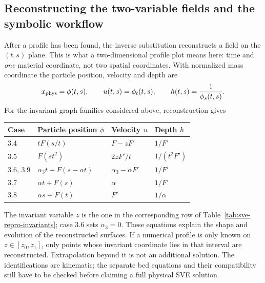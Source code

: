 \documentclass[11pt]{article}
\theoremstyle{definition}
\begin{document}
\subsection{Reconstructing the two-variable fields and the symbolic workflow}
After a profile has been found, the inverse substitution reconstructs a
field on the $(t,s)$ plane. This is what a two-dimensional profile plot
means here: time and \emph{one} material coordinate, not two spatial
coordinates. With normalized mass coordinate the particle position,
velocity and depth are
\[
 x_{\rm phys}=\phi(t,s),\qquad u(t,s)=\phi_t(t,s),\qquad
 h(t,s)=\frac1{\phi_s(t,s)}.
\]
For the invariant graph families considered above, reconstruction gives
\begin{center}\small
\begin{tabular}{@{}llll@{}}
\toprule
Case & Particle position $\phi$ & Velocity $u$ & Depth $h$\\
\midrule
3.4 & $tF(s/t)$ & $F-zF'$ & $1/F'$\\
3.5 & $F(st^2)$ & $2zF'/t$ & $1/(t^2F')$\\
3.6, 3.9 & $\alpha_3t+F(s-\alpha t)$ & $\alpha_3-\alpha F'$ & $1/F'$\\
3.7 & $\alpha t+F(s)$ & $\alpha$ & $1/F'$\\
3.8 & $\alpha s+F(t)$ & $F'$ & $1/\alpha$\\
\bottomrule
\end{tabular}
\end{center}
The invariant variable $z$ is the one in the corresponding row of
Table~\ref{tab:sve-repro-invariants}; case 3.6 sets $\alpha_3=0$.
These equations explain the shape and evolution of the reconstructed
surfaces. If a numerical profile is only known on $z\in[z_0,z_1]$,
only points whose invariant coordinate lies in that interval are
reconstructed. Extrapolation beyond it is not an additional solution.
The identifications are kinematic; the separate bed equations and their
compatibility still have to be checked before claiming a full physical SVE
solution.
\end{document}
